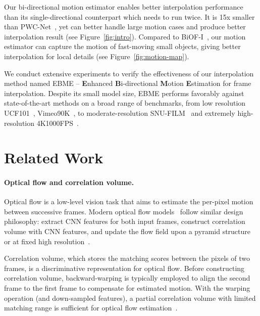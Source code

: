 \documentclass[10pt,twocolumn,letterpaper]{article}
\begin{document}
Our bi-directional motion estimator enables better interpolation performance
than its single-directional counterpart which needs to run twice. It is 15x
smaller than PWC-Net~\cite{sun2018pwc}, yet can better handle large motion cases
and produce better interpolation result (see Figure~\ref{fig:intro}).  Compared
to BiOF-I~\cite{sim2021xvfi}, our motion estimator can capture the motion of
fast-moving small objects, giving better interpolation for local details (see
Figure~\ref{fig:motion-map}).  







We conduct extensive experiments to verify the effectiveness of our
interpolation method named EBME -- \textbf{E}nhanced \textbf{B}i-directional
\textbf{M}otion \textbf{E}stimation for frame interpolation. Despite its small
model size, EBME performs favorably against state-of-the-art methods on a broad
range of benchmarks, from low resolution UCF101~\cite{soomro2012ucf101},
Vimeo90K~\cite{xue2019video}, to moderate-resolution
SNU-FILM~\cite{choi2020channel} and extremely high-resolution
4K1000FPS~\cite{sim2021xvfi}.



\section{Related Work}

\paragraph{Optical flow and correlation volume.} Optical flow is a low-level
vision task that aims to estimate the per-pixel motion between successive
frames.
Modern optical flow models~\cite{sun2018pwc,hur2019iterative,teed2020raft} follow similar design
philosophy: extract CNN features for both input frames, construct correlation
volume with CNN features, and update the flow field upon a pyramid
structure~\cite{sun2018pwc} or at fixed high resolution~\cite{teed2020raft}.

Correlation volume, which stores the matching scores between the pixels of two
frames, is a discriminative representation for optical flow.  Before
constructing correlation volume, backward-warping is typically employed to align
the second frame to the first frame to compensate for estimated motion.  With
the warping operation (and down-sampled features), a partial correlation volume
with limited matching range is sufficient for optical flow
estimation~\cite{sun2018pwc}.
\end{document}
